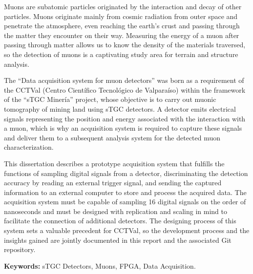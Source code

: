 Muons are subatomic particles originated by the interaction and decay of other particles. Muons originate mainly from cosmic radiation from outer space and penetrate the atmosphere, even reaching the earth's crust and passing through the matter they encounter on their way. Measuring the energy of a muon after passing through matter allows us to know the density of the materials traversed, so the detection of muons is a captivating study area for terrain and structure analysis.

The ``Data acquisition system for muon detectors'' was born as a requirement of the CCTVal (Centro Científico Tecnológico de Valparaíso) within the framework of the ``sTGC Minería'' project, whose objective is to carry out muonic tomography of mining land using sTGC detectors. A detector emits electrical signals representing the position and energy associated with the interaction with a muon, which is why an acquisition system is required to capture these signals and deliver them to a subsequent analysis system for the detected muon characterization.

This dissertation describes a prototype acquisition system that fulfills the functions of sampling digital signals from a detector, discriminating the detection accuracy by reading an external trigger signal, and sending the captured information to an external computer to store and process the acquired data. The acquisition system must be capable of sampling 16 digital signals on the order of nanoseconds and must be designed with replication and scaling in mind to facilitate the connection of additional detectors. The designing process of this system sets a valuable precedent for CCTVal, so the development process and the insights gained are jointly documented in this report and the associated Git repository.

\textbf {Keywords:}  sTGC Detectors,  Muons, FPGA, Data Acquisition.